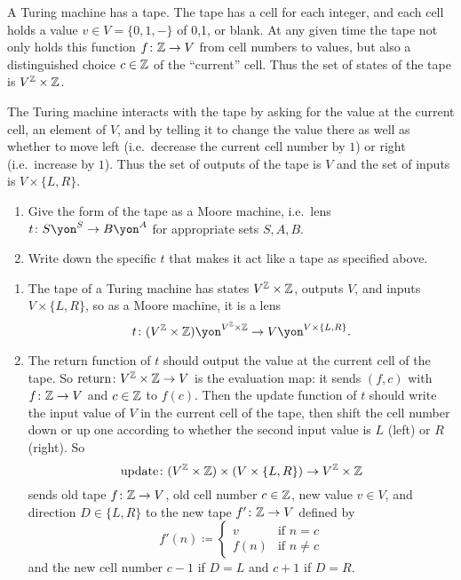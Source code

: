 \documentclass[Book-Poly]{subfiles}
\begin{document}
\begin{exercise}
A Turing machine has a tape. The tape has a cell for each integer, and each cell holds a value $v\in V=\{0,1,-\}$ of 0,1, or blank. At any given time the tape not only holds this function $f\colon\mathbb{Z}\to V$ from cell numbers to values, but also a distinguished choice $c\in\mathbb{Z}$ of the ``current'' cell. Thus the set of states of the tape is $V^{\mathbb{Z}}\times\mathbb{Z}$.

The Turing machine interacts with the tape by asking for the value at the current cell, an element of $V$, and by telling it to change the value there as well as whether to move left (i.e.\ decrease the current cell number by $1$) or right (i.e.\ increase by $1$). Thus the set of outputs of the tape is $V$ and the set of inputs is $V\times\{L,R\}$.

\begin{enumerate}
	\item Give the form of the tape as a Moore machine, i.e.\ lens $t\colon S\yon^S\to B\yon^A$ for appropriate sets $S, A, B$.
	\item Write down the specific $t$ that makes it act like a tape as specified above.
\qedhere
\end{enumerate}
\begin{solution}
\begin{enumerate}
    \item The tape of a Turing machine has states $V^{\mathbb{Z}} \times \mathbb{Z}$, outputs $V$, and inputs $V \times \{L, R\}$, so as a Moore machine, it is a lens
    \[
        t \colon (V^\zz \times \zz)\yon^{V^\zz \times \zz} \to V\yon^{V \times \{L,R\}}.
    \]
    \item The return function of $t$ should output the value at the current cell of the tape. So $\text{return} \colon V^{\mathbb{Z}} \times \mathbb{Z} \to V$ is the evaluation map: it sends $(f,c)$ with $f \colon \mathbb{Z} \to V$ and $c \in \mathbb{Z}$ to $f(c)$.
    Then the update function of $t$ should write the input value of $V$ in the current cell of the tape, then shift the cell number down or up one according to whether the second input value is $L$ (left) or $R$ (right).
    So
    \[
        \text{update} \colon (V^{\mathbb{Z}} \times \mathbb{Z}) \times (V \times \{L,R\}) \to V^{\mathbb{Z}} \times \mathbb{Z}
    \]
    sends old tape $f \colon \mathbb{Z} \to V$, old cell number $c \in \mathbb{Z}$, new value $v \in V$, and direction $D \in \{L,R\}$ to the new tape $f' \colon \mathbb{Z} \to V$ defined by
    \[
        f'(n)\coloneqq
        \begin{cases}
            v & \text{if } n = c \\
            f(n) & \text{if } n \neq c
        \end{cases}
    \]
    and the new cell number $c-1$ if $D=L$ and $c+1$ if $D = R$.
\end{enumerate}
\end{solution}
\end{exercise}
\end{document}
